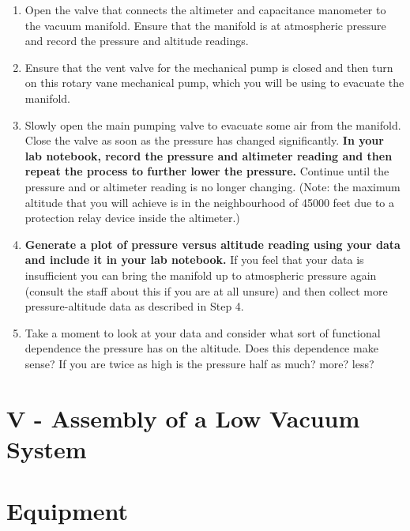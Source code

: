 \begin{enumerate}
\item Open the valve that connects the altimeter and capacitance manometer to the vacuum manifold. Ensure that the manifold is at atmospheric pressure and record the pressure and altitude readings.   

\item Ensure that the vent valve for the mechanical pump is closed and then turn on this rotary vane mechanical pump, which you will be using to evacuate the manifold.  

\item Slowly open the main pumping valve to evacuate some air from the manifold. Close the valve as soon as the pressure has changed significantly. {\bf In your lab notebook, record the pressure and altimeter reading and then repeat the process to further lower the pressure.}  Continue until the pressure and or altimeter reading is no longer changing. (Note: the maximum altitude that you will achieve is in the neighbourhood of 45000 feet due to a protection relay device inside the altimeter.)

\item {\bf Generate a plot of pressure versus altitude reading using your data and include it in your lab notebook.} If you feel that your data is insufficient you can bring the manifold up to atmospheric pressure again (consult the staff about this if you are at all unsure) and then collect more pressure-altitude data as described in Step 4.

\item Take a moment to look at your data and consider what sort of functional dependence the pressure has on the altitude. Does this dependence make sense? If you are twice as high is the pressure half as much? more? less?
\end{enumerate}

\section{V - Assembly of a Low Vacuum System}

\section{Equipment}

